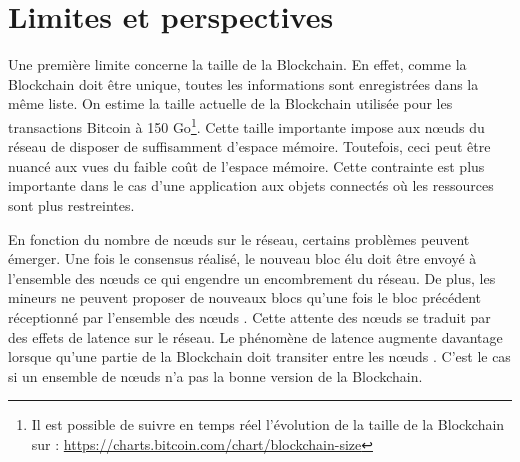 \documentclass{article}
\newcommand{\noeuds}{n\oe uds }
\begin{document}


\section{Limites et perspectives}

Une première limite concerne la taille de la Blockchain. En effet, comme la Blockchain doit être unique, toutes les informations sont enregistrées dans la même liste. On estime la taille actuelle de la Blockchain utilisée pour les transactions Bitcoin à 150 Go\footnote{Il est possible de suivre en temps réel l'évolution de la taille de la Blockchain sur : \url{https://charts.bitcoin.com/chart/blockchain-size}}. Cette taille importante impose aux \noeuds du réseau de disposer de suffisamment d'espace mémoire. Toutefois, ceci peut être nuancé aux vues du faible coût de l'espace mémoire. Cette contrainte est plus importante dans le cas d'une application aux objets connectés où les ressources sont plus restreintes.

En fonction du nombre de \noeuds sur le réseau, certains problèmes peuvent émerger. Une fois le consensus réalisé, le nouveau bloc élu doit être envoyé à l'ensemble des \noeuds ce qui engendre un encombrement du réseau. De plus, les mineurs ne peuvent proposer de nouveaux blocs qu'une fois le bloc précédent réceptionné par l'ensemble des \noeuds. Cette attente des \noeuds se traduit par des effets de latence sur le réseau. Le phénomène de latence augmente davantage lorsque qu'une partie de la Blockchain doit transiter entre les \noeuds. C'est le cas si un ensemble de \noeuds n'a pas la bonne version de la Blockchain. 

\end{document}
